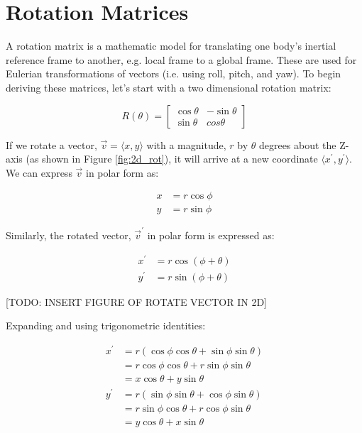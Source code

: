 \chapter{Rotation Matrices} \label{chap:rotation_matrix}
A rotation matrix is a mathematic model for translating one body's inertial reference frame to another, e.g. local frame to a global frame.
These are used for Eulerian transformations of vectors (i.e. using roll, pitch, and yaw).
To begin deriving these matrices, let's start with a two dimensional rotation matrix:

\begin{equation*}
    R(\theta) = \left[
        \begin{matrix}
            \cos\theta & -\sin\theta \\
            \sin\theta & cos\theta
        \end{matrix}\right]
\end{equation*}

If we rotate a vector, $\vec{v} = \langle x, y \rangle$ with a magnitude, $r$ by $\theta$ degrees about the Z-axis (as shown in Figure \ref{fig:2d_rot}), it will arrive at a new coordinate $\langle x^{\prime}, y^{\prime}\rangle$. 
We can express $\vec{v}$ in polar form as:

\begin{align}
    x &= r\cos\phi \\
    y &= r\sin\phi
\end{align}

Similarly, the rotated vector, $\vec{v}^{\prime}$ in polar form is expressed as:

\begin{align*}
    x^{\prime} &= r\cos(\phi+\theta) \\
    y^{\prime} &= r\sin(\phi+\theta)
\end{align*}

[TODO: INSERT FIGURE OF ROTATE VECTOR IN 2D]

Expanding and using trigonometric identities:

\begin{align*}
    x^{\prime} &= r(\cos\phi\cos\theta + \sin\phi\sin\theta) \\
               &= r\cos\phi\cos\theta + r\sin\phi\sin\theta \\
               &= x\cos\theta + y\sin\theta \\
    y^{\prime} &= r(\sin\phi\sin\theta + \cos\phi\sin\theta) \\
               &= r\sin\phi\cos\theta + r\cos\phi\sin\theta \\
               &= y\cos\theta + x\sin\theta
\end{align*}

